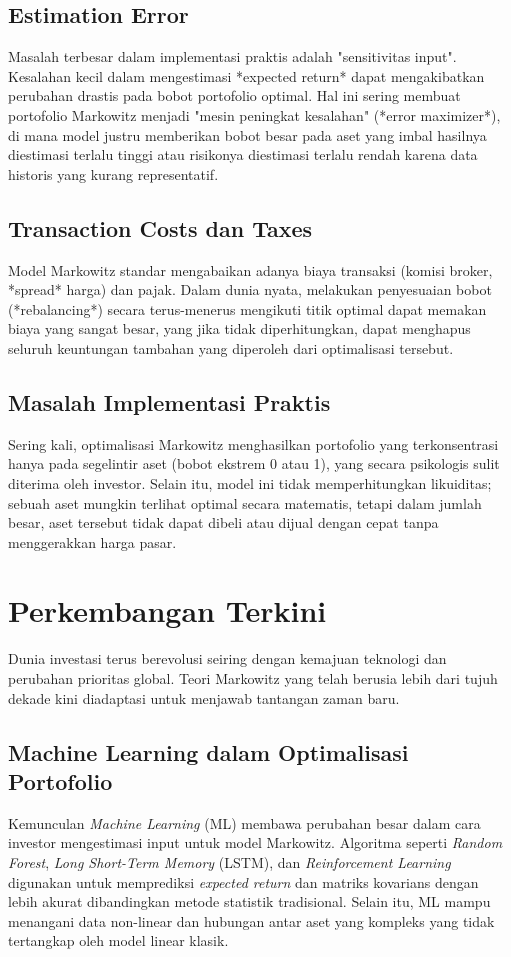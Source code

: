 \documentclass[12pt,a4paper]{book}
\begin{document}
\section{Estimation Error}
Masalah terbesar dalam implementasi praktis adalah "sensitivitas input". Kesalahan kecil dalam mengestimasi *expected return* dapat mengakibatkan perubahan drastis pada bobot portofolio optimal. Hal ini sering membuat portofolio Markowitz menjadi "mesin peningkat kesalahan" (*error maximizer*), di mana model justru memberikan bobot besar pada aset yang imbal hasilnya diestimasi terlalu tinggi atau risikonya diestimasi terlalu rendah karena data historis yang kurang representatif.

\section{Transaction Costs dan Taxes}
Model Markowitz standar mengabaikan adanya biaya transaksi (komisi broker, *spread* harga) dan pajak. Dalam dunia nyata, melakukan penyesuaian bobot (*rebalancing*) secara terus-menerus mengikuti titik optimal dapat memakan biaya yang sangat besar, yang jika tidak diperhitungkan, dapat menghapus seluruh keuntungan tambahan yang diperoleh dari optimalisasi tersebut.

\section{Masalah Implementasi Praktis}
Sering kali, optimalisasi Markowitz menghasilkan portofolio yang terkonsentrasi hanya pada segelintir aset (bobot ekstrem 0 atau 1), yang secara psikologis sulit diterima oleh investor. Selain itu, model ini tidak memperhitungkan likuiditas; sebuah aset mungkin terlihat optimal secara matematis, tetapi dalam jumlah besar, aset tersebut tidak dapat dibeli atau dijual dengan cepat tanpa menggerakkan harga pasar.

\chapter{Perkembangan Terkini}

Dunia investasi terus berevolusi seiring dengan kemajuan teknologi dan perubahan prioritas global. Teori Markowitz yang telah berusia lebih dari tujuh dekade kini diadaptasi untuk menjawab tantangan zaman baru.

\section{Machine Learning dalam Optimalisasi Portofolio}
Kemunculan \textit{Machine Learning} (ML) membawa perubahan besar dalam cara investor mengestimasi input untuk model Markowitz. Algoritma seperti \textit{Random Forest}, \textit{Long Short-Term Memory} (LSTM), dan \textit{Reinforcement Learning} digunakan untuk memprediksi \textit{expected return} dan matriks kovarians dengan lebih akurat dibandingkan metode statistik tradisional. Selain itu, ML mampu menangani data non-linear dan hubungan antar aset yang kompleks yang tidak tertangkap oleh model linear klasik.
\end{document}
